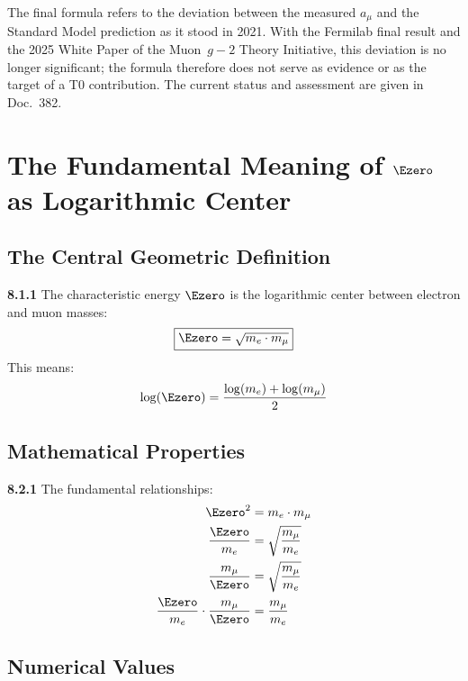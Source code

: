 	The final formula refers to the deviation between the measured $a_\mu$ and the Standard Model prediction as it stood in 2021. With the Fermilab final result and the 2025 White Paper of the Muon~$g-2$ Theory Initiative, this deviation is no longer significant; the formula therefore does not serve as evidence or as the target of a T0 contribution. The current status and assessment are given in Doc.~382.
	
\section{The Fundamental Meaning of $\Ezero$ as Logarithmic Center}

\subsection{The Central Geometric Definition}

\begin{tcolorbox}[colback=yellow!10!white,colframe=red!75!black,title=Fundamental Definition]
	\noindent \textbf{8.1.1} The characteristic energy $\Ezero$ is the logarithmic center between electron and muon masses:
	\begin{equation}
		\boxed{\Ezero = \sqrt{m_e \cdot m_\mu}}
		\label{eq:E0_fundamental}
	\end{equation}
	This means:
	\begin{equation}
		\log(\Ezero) = \frac{\log(m_e) + \log(m_\mu)}{2}
		\label{eq:E0_logarithmic}
	\end{equation}
\end{tcolorbox}

\subsection{Mathematical Properties}

\noindent \textbf{8.2.1} The fundamental relationships:
\begin{align}
	\Ezero^2 &= m_e \cdot m_\mu \label{eq:E0_squared} \\
	\frac{\Ezero}{m_e} &= \sqrt{\frac{m_\mu}{m_e}} \label{eq:E0_ratio1} \\
	\frac{m_\mu}{\Ezero} &= \sqrt{\frac{m_\mu}{m_e}} \label{eq:E0_ratio2} \\
	\frac{\Ezero}{m_e} \cdot \frac{m_\mu}{\Ezero} &= \frac{m_\mu}{m_e} \label{eq:E0_product}
\end{align}

\subsection{Numerical Values}

